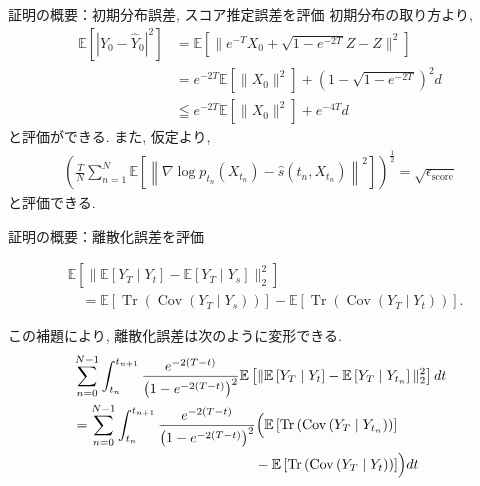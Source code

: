 \documentclass[11pt]{beamer}
\newcommand{\E}{\mathbb{E}}
\newcommand{\Tr}{\operatorname{Tr}}
\newcommand{\Cov}{\operatorname{Cov}}
\begin{document}
\begin{frame}{証明の概要：初期分布誤差, スコア推定誤差を評価}
      初期分布の取り方より,
      \begin{align*}
        \E\left[\left|Y_0-\hat{Y}_0\right|^2\right]&=\E\left[\|e^{-T}X_0+\sqrt{1-e^{-2T}}Z-Z\|^2\right]\\
        &=e^{-2T}\E\left[\|X_0\|^2\right]+(1-\sqrt{1-e^{-2T}})^2d\\
        &\leqq e^{-2T}\E\left[\|X_0\|^2\right]+e^{-4T}d
      \end{align*}
      と評価ができる.
      また, 仮定より,
      \begin{align*}
        \left(\frac{T}{N}\sum\limits_{n=1}^{N}
          \E\left[
            \left\|\nabla\log p_{t_n}(X_{t_n})
            -\hat{s}(t_n,X_{t_n})\right\|^2
          \right]
          \right)^\frac{1}{2}=\sqrt{\epsilon_{\text{score}}}
      \end{align*}
      と評価できる.
\end{frame}
\begin{frame}{証明の概要：離散化誤差を評価}
      \begin{lemma}
        \begin{align*}\label{eq:posterior-mean-increment}
          &\E\left[
            \|\E\left[Y_T\mid Y_t\right]
            -\E\left[Y_T\mid Y_s\right]\|_2^2
          \right]\\[-0.1em]
          &\quad=
          \E\left[\Tr\left(\Cov\left(Y_T\mid Y_s\right)\right)\right]
          -\E\left[\Tr\left(\Cov\left(Y_T\mid Y_t\right)\right)\right].
      \end{align*}
      \end{lemma}
      この補題により, 離散化誤差は次のように変形できる.
      \begin{align*}
        &\sum_{n=0}^{N-1}\int_{t_n}^{t_{n+1}}
                \frac{e^{-2(T-t)}}{\left(1-e^{-2(T-t)}\right)^2}\E\left[
              \|\E\left[Y_T\mid Y_t\right]-\E\left[Y_T\mid Y_{t_n}\right]\|_2^2
          \right]dt\\
        &=\sum_{n=0}^{N-1}\int_{t_n}^{t_{n+1}}
                \frac{e^{-2(T-t)}}{\left(1-e^{-2(T-t)}\right)^2}\Bigl(\E\left[\Tr\left(\Cov\left(Y_T\mid Y_{t_n}\right)\right)\right]\\
          &\quad\quad\quad\quad\quad\quad\quad\quad\quad \quad \quad \quad\quad
          -\E\left[\Tr\left(\Cov\left(Y_T\mid Y_t\right)\right)\right]\Bigr)dt
      \end{align*}
\end{frame}
\end{document}
